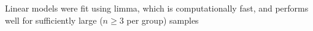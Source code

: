 Linear models were fit using limma\autocite{ritchie2015LimmaPowersDifferential}, which is computationally fast, and performs well for sufficiently large ($n \ge 3$ per group) samples\autocite{soneson2013ComparisonMethodsDifferential}
